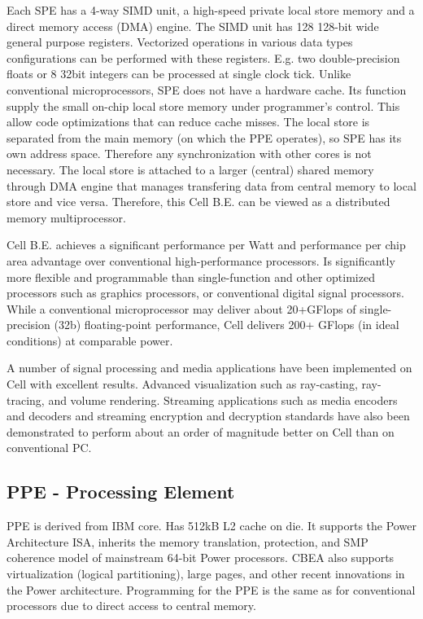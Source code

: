 Each SPE has a 4-way SIMD unit, a high-speed private local store memory and a direct memory access (DMA) engine.
The SIMD unit has 128 128-bit wide general purpose registers.
Vectorized operations in various data types configurations can be performed with these registers.
E.g. two double-precision floats or 8 32bit integers can be processed at single clock tick.
Unlike conventional microprocessors, SPE does not have a hardware cache.
Its function supply the small on-chip local store memory under programmer's control.
This allow code optimizations that can reduce cache misses.
The local store is separated from the main memory (on which the PPE operates), so SPE has its own address space.
Therefore any synchronization with other cores is not necessary.
The local store is attached to a larger (central) shared memory through DMA engine that
manages transfering data from central memory to local store and vice versa.
Therefore, this Cell B.E. can be viewed as a distributed memory multiprocessor.

Cell B.E. achieves a significant performance per Watt and performance per chip area advantage over conventional high-performance processors.
Is significantly more flexible and programmable than single-function and other optimized processors such as graphics processors, or conventional digital signal processors.
While a conventional microprocessor may deliver about 20+GFlops of single-precision (32b) floating-point performance, Cell delivers 200+ GFlops (in ideal conditions) at comparable power.

A number of signal processing and media applications have been implemented on Cell with excellent results.
Advanced visualization such as ray-casting, ray-tracing, and volume rendering.
Streaming applications such as media encoders and decoders and streaming encryption and decryption standards have also been demonstrated to perform about an order of magnitude better on Cell than on conventional PC.

\subsection{PPE -  Processing Element}
PPE is derived from IBM  core. Has 512kB L2 cache on die.
It supports the Power Architecture ISA, inherits the memory translation, protection, and SMP coherence model of mainstream 64-bit Power processors.
CBEA also supports virtualization (logical partitioning), large pages, and other recent innovations in the Power architecture.
Programming for the PPE is the same as for conventional processors due to direct access to central memory.

